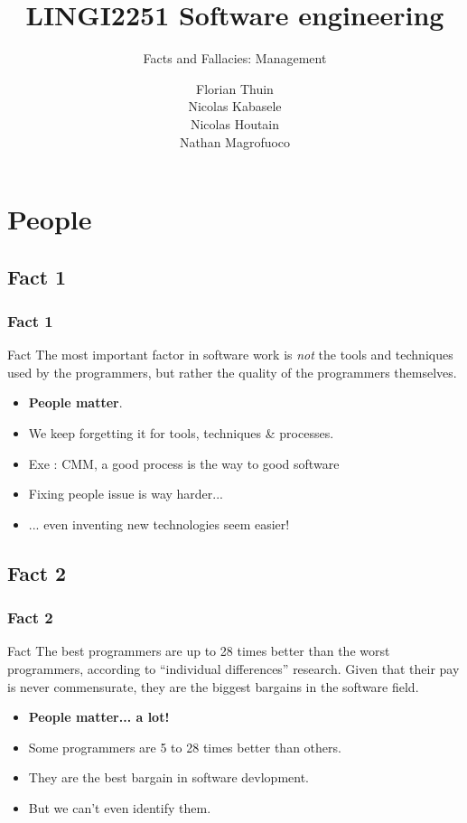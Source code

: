 \documentclass{beamer}
\title{LINGI2251 Software engineering}
\subtitle{Facts and Fallacies: Management}
\author{Florian Thuin \\ Nicolas Kabasele \\ Nicolas Houtain \\ Nathan Magrofuoco}
\institute{Ecole Polytechnique de Louvain}
\begin{document}
\begin{frame}[plain]
	\titlepage{}
\end{frame}



\section{People}

\subsection{Fact 1}
\begin{frame}
    \frametitle{Fact 1}
    \begin{block}{Fact}
        The most important factor in software work is \textit{not} the tools and
        techniques used by the programmers, but rather the quality of the
        programmers themselves.
    \end{block}
    \begin{itemize}
     \pause
     \item \textbf{People matter}.
     \pause
     \item We keep forgetting it for tools, techniques \& processes.
     \pause
     \item Exe : CMM, a good process is the way to good software
     \pause
     \item Fixing people issue is way harder...
     \pause
     \item ... even inventing new technologies seem easier!
    \end{itemize}

\end{frame}

\subsection{Fact 2}
\begin{frame}
    \frametitle{Fact 2}
    \begin{block}{Fact}
    The best programmers are up to 28 times better than the worst programmers,
    according to \enquote{individual differences} research. Given that
    their pay is never commensurate, they are the biggest bargains in the
    software field.
    \end{block}
    \begin{itemize}
     \pause
     \item \textbf{People matter... a lot!}
     \pause
     \item Some programmers are 5 to 28 times better than others.
     \pause
     \item They are the best bargain in software devlopment.
     \pause
     \item But we can't even identify them.
    \end{itemize}

\end{frame}
\end{document}
